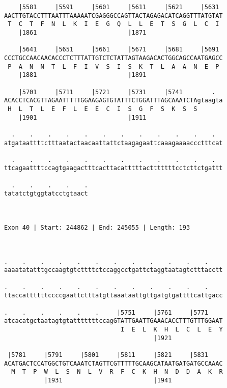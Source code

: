 \documentclass{article}
\begin{document}
\begin{Verbatim}
    |5581     |5591     |5601     |5611     |5621     |5631 
AACTTGTACCTTTAATTTAAAAATCGAGGGCCAGTTACTAGAGACATCAGGTTTATGTAT
 T  C  T  F  N  L  K  I  E  G  Q  L  L  E  T  S  G  L  C  I 
    |1861                         |1871                     
  
    |5641     |5651     |5661     |5671     |5681     |5691 
CCCTGCCAACAACACCCTCTTTATTGTCTCTATTAGTAAGACACTGGCAGCCAATGAGCC
 P  A  N  N  T  L  F  I  V  S  I  S  K  T  L  A  A  N  E  P 
    |1881                         |1891                     
  
    |5701     |5711     |5721     |5731     |5741        .  
ACACCTCACGTTAGAATTTTTGGAAGAGTGTATTTCTGGATTTAGCAAATCTAgtaagta
 H  L  T  L  E  F  L  E  E  C  I  S  G  F  S  K  S  S       
    |1901                         |1911                     
  
  .    .    .    .    .    .    .    .    .    .    .    .  
atgataattttctttaatactaacaattattctaagagaattcaaagaaaaccctttcat
                                                            
  .    .    .    .    .    .    .    .    .    .    .    .  
ttcagaattttccagtgaagactttcacttacatttttactttttttcctcttctgattt
                                                            
  .    .    .    .    .
tatatctgtggtatcctgtaact
                       
                       
 
Exon 40 | Start: 244862 | End: 245055 | Length: 193



.    .    .    .    .    .    .    .    .    .    .    .    
aaaatatatttgccaagtgtcttttctccaggcctgattctaggtaatagtctttacctt
                                                            
.    .    .    .    .    .    .    .    .    .    .    .    
ttaccattttttccccgaattctttatgttaaataattgttgatgtgattttcattgacc
                                                            
.    .    .    .    .    .     |5751     |5761     |5771    
atcacatgctaatagtgtatttttttccagGTATTGAATTGAAACACCTTTGTTTGGAAT
                                I  E  L  K  H  L  C  L  E  Y
                                         |1921              
  
 |5781     |5791     |5801     |5811     |5821     |5831    
ACATGACTCCATGGCTGTCAAATCTAGTTCGTTTTTGCAAGCATAATGATGATGCCAAAC
  M  T  P  W  L  S  N  L  V  R  F  C  K  H  N  D  D  A  K  R
           |1931                         |1941              
  

\end{Verbatim}
\end{document}
